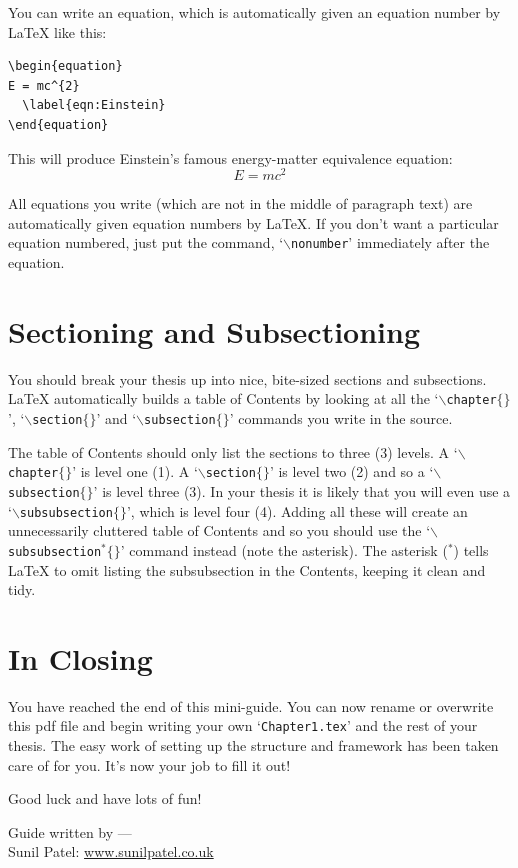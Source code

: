 You can write an equation, which is automatically given an equation number by \LaTeX{} like this:
\begin{verbatim}
\begin{equation}
E = mc^{2}
  \label{eqn:Einstein}
\end{equation}
\end{verbatim}

This will produce Einstein's famous energy-matter equivalence equation:
\begin{equation}
E = mc^{2}
\label{eqn:Einstein}
\end{equation}

All equations you write (which are not in the middle of paragraph text) are automatically given equation numbers by \LaTeX{}. If you don't want a particular equation numbered, just put the command, `$\backslash$\texttt{nonumber}' immediately after the equation.


\section{Sectioning and Subsectioning}

You should break your thesis up into nice, bite-sized sections and subsections. \LaTeX{} automatically builds a table of Contents by looking at all the `$\backslash$\texttt{chapter}$\{\}$', `$\backslash$\texttt{section}$\{\}$' and `$\backslash$\texttt{subsection}$\{\}$' commands you write in the source.

The table of Contents should only list the sections to three (3) levels. A `$\backslash$\texttt{chapter}$\{\}$' is level one (1). A `$\backslash$\texttt{section}$\{\}$' is level two (2) and so a `$\backslash$\texttt{subsection}$\{\}$' is level three (3). In your thesis it is likely that you will even use a `$\backslash$\texttt{subsubsection}$\{\}$', which is level four (4). Adding all these will create an unnecessarily cluttered table of Contents and so you should use the `$\backslash$\texttt{subsubsection$^{*}\{\}$}' command instead (note the asterisk). The asterisk ($^{*}$) tells \LaTeX{} to omit listing the subsubsection in the Contents, keeping it clean and tidy.


\section{In Closing}

You have reached the end of this mini-guide. You can now rename or overwrite this pdf file and begin writing your own `\texttt{Chapter1.tex}' and the rest of your thesis. The easy work of setting up the structure and framework has been taken care of for you. It's now your job to fill it out!

Good luck and have lots of fun!

\begin{flushright}
Guide written by ---\\
Sunil Patel: \href{http://www.sunilpatel.co.uk}{www.sunilpatel.co.uk}
\end{flushright}
